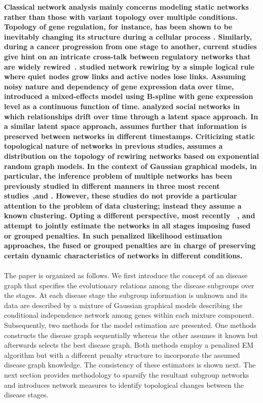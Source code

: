 \documentclass[10pt]{article}
\begin{document}
\textbf{Classical network analysis mainly concerns modeling static networks rather than those with variant topology over multiple conditions. Topology of gene regulation, for instance, has been shown to be inevitably changing its structure during a cellular process \citep{nowak2006,luscombe2004}. Similarly, during a cancer progression from one stage to another, current studies give hint on an intricate cross-talk between regulatory networks that are widely rewired~\citep{huang2006,wood2007,attolini2009}. \citet{bornholdt2000} studied network rewiring by a simple logical rule where quiet nodes grow links and active nodes lose links. Assuming noisy nature and dependency of gene expression data over time, \citet{luan2003} introduced a mixed-effects model using B-spline with gene expression level as a continuous function of time. \citet{hoff2002latent} analyzed social networks in which relationships drift over time through a latent space approach. In a similar latent space approach, \citet{sarkar2005} assumes further that information is preserved between networks in different timestamps. Criticizing static topological nature of networks in previous studies, \citet{guo2007} assumes a distribution on the topology of rewiring networks based on exponential random graph models. In the context of Gaussian graphical models, in particular, the inference problem of multiple networks  has been previously studied in different manners in three most recent studies~\citet{danaher2014joint,guo2011joint},and \citet{zhu2014structural}. However, these studies do not provide a particular attention to the problem of data clustering; instead they assume a known clustering. Opting a different perspective, most recently ~\citet{ danaher2014, zhu2014structural}, and \citet{Bilg2015} attempt to jointly estimate the networks in all stages imposing fused or grouped penalties. In such penalized likelihood estimation approaches, the fused or grouped penalties are in charge of preserving certain dynamic characteristics of networks in different conditions.}
\\
\\
The paper is organized as follows. We first introduce the concept of an disease graph that specifies the evolutionary relations among the disease subgroups over the stages. At each disease stage the subgroup information is unknown and its data are described by a mixture of Gaussian graphical models describing the conditional independence network among genes within each mixture component. Subsequently, two methods for the model estimation are presented. One methods constructs the disease graph sequentially whereas the other assumes it known but afterwards selects the best disease graph. Both methods employ a penalized EM algorithm but with a different penalty structure to incorporate the assumed disease graph knowledge. The consistency of these estimators is shown next. The next section provides methodology to sparsify the resultant subgroup networks and introduces network measures to identify topological changes between the disease stages.
\end{document}
